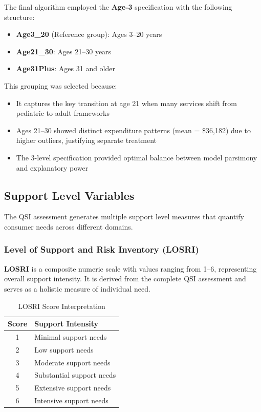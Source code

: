 The final algorithm employed the \textbf{Age-3} specification with the following structure:

\begin{itemize}
    \item \textbf{Age3\_20} (Reference group): Ages 3--20 years
    \item \textbf{Age21\_30}: Ages 21--30 years
    \item \textbf{Age31Plus}: Ages 31 and older
\end{itemize}

This grouping was selected because:
\begin{itemize}
    \item It captures the key transition at age 21 when many services shift from pediatric to adult frameworks
    \item Ages 21--30 showed distinct expenditure patterns (mean = \$36,182) due to higher outliers, justifying separate treatment
    \item The 3-level specification provided optimal balance between model parsimony and explanatory power
\end{itemize}

\subsection{Support Level Variables}
\label{subsec:support-level-variables}

The QSI assessment generates multiple support level measures that quantify consumer needs across different domains.

\subsubsection{Level of Support and Risk Inventory (LOSRI)}

\textbf{LOSRI} is a composite numeric scale with values ranging from 1--6, representing overall support intensity. It is derived from the complete QSI assessment and serves as a holistic measure of individual need.

\begin{table}[H]
\centering
\caption{LOSRI Score Interpretation}
\begin{tabular}{cl}
\toprule
\textbf{Score} & \textbf{Support Intensity} \\
\midrule
1 & Minimal support needs \\
2 & Low support needs \\
3 & Moderate support needs \\
4 & Substantial support needs \\
5 & Extensive support needs \\
6 & Intensive support needs \\
\bottomrule
\end{tabular}
\label{tab:losri-interpretation}
\end{table}


